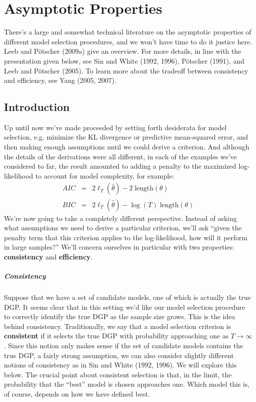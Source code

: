 \chapter{Asymptotic Properties}
There's a large and somewhat technical literature on the asymptotic properties of different model selection procedures, and we won't have time to do it justice here.
Leeb and P\"{o}tscher (2009a) give an overview.
For more details, in line with the presentation given below, see Sin and White (1992, 1996), P\"{o}tscher (1991), and Leeb and P\"{o}tscher (2005).
To learn more about the tradeoff between consistency and efficiency, see Yang (2005, 2007).

\section{Introduction}
Up until now we've made proceeded by setting forth desiderata for model selection, e.g. minimize the KL divergence or predictive mean-squared error, and then making enough assumptions until we could derive a criterion. 
And although the details of the derivations were all different, in each of the examples we've considered to far, the result amounted to adding a penalty to the maximized log-likelihood to account for model complexity, for example:
	\begin{eqnarray*}
		AIC &=& 2\ell_T(\widehat{\theta}) - 2\; \mbox{length}(\theta)\\
		BIC &=& 2\ell_T(\widehat{\theta}) - \log(T)\; \mbox{length}(\theta)
	\end{eqnarray*}
We're now going to take a completely different perspective. 
Instead of asking what assumptions we need to derive a particular criterion, we'll ask ``given the penalty term that this criterion applies to the log-likelihood, how will it perform in large samples?'' 
We'll concern ourselves in particular with two properties: \textbf{consistency} and \textbf{efficiency}. 

\paragraph{Consistency} 
Suppose that we have a set of candidate models, one of which is actually the true DGP.
It seems clear that in this setting we'd like our model selection procedure to correctly identify the true DGP as the sample size grows.
This is the idea behind consistency.
Traditionally, we say that a model selection criterion is \textbf{consistent} if it selects the true DGP with probability approaching one as $T\rightarrow \infty$.
Since this notion only makes sense if the set of candidate models contains the true DGP, a fairly strong assumption, we can also consider slightly different notions of consistency as in Sin and White (1992, 1996).
We will explore this below.
The crucial point about consistent selection is that, in the limit, the probability that the ``best'' model is chosen approaches one.
Which model this is, of course, depends on how we have defined best.


